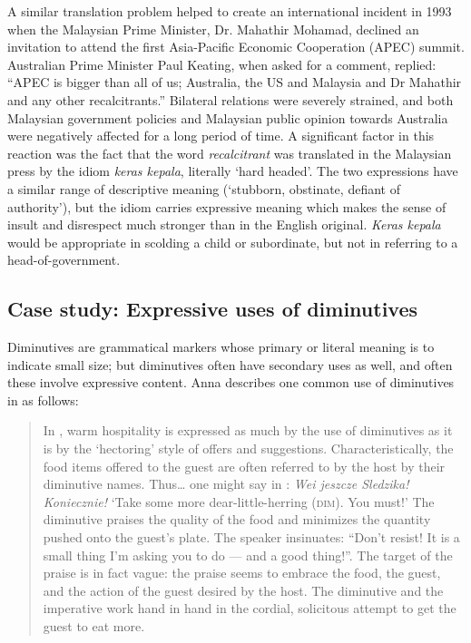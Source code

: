 A similar translation problem helped to create an international incident in 1993 when the Malaysian Prime Minister, Dr. Mahathir Mohamad, declined an invitation to attend the first Asia-Pacific Economic Cooperation (APEC) summit. {Australian} Prime Minister Paul Keating, when asked for a comment, replied: “APEC is bigger than all of us; Australia, the US and Malaysia and Dr Mahathir and any other recalcitrants.” Bilateral relations were severely strained, and both Malaysian government policies and Malaysian public opinion towards Australia were negatively affected for a long period of time. A significant factor in this reaction was the fact that the word \textit{recalcitrant} was translated in the Malaysian press by the  idiom \textit{keras kepala}, literally ‘hard headed’. The two expressions have a similar range of descriptive meaning (‘stubborn, obstinate, defiant of authority’), but the  idiom carries expressive meaning which makes the sense of insult and disrespect much stronger than in the English original. \textit{Keras kepala} would be appropriate in scolding a child or subordinate, but not in referring to a head-of-government.


\subsection{Case study: Expressive uses of diminutives}\label{sec:2.6.6}

Diminutives are grammatical markers whose primary or literal meaning is to indicate small size; but diminutives often have secondary uses as well, and often these involve expressive content. Anna \citet{Wierzbicka1985} describes one common use of diminutives in  as follows:\largerpage


\begin{quote}
In , warm hospitality is expressed as much by the use of diminutives as it is by the ‘hectoring’ style of offers and suggestions. Characteristically, the food items offered to the guest are often referred to by the host by their diminutive names. Thus… one might say in : \textit{Wei jeszcze Sledzika! Koniecznie!} ‘Take some more dear-little-herring (\textsc{dim}). You must!’ The diminutive praises the quality of the food and minimizes the quantity pushed onto the guest’s plate. The speaker insinuates: “Don’t resist! It is a small thing I’m asking you to do — and a good thing!”. The target of the praise is in fact vague: the praise seems to embrace the food, the guest, and the action of the guest desired by the host. The diminutive and the imperative work hand in hand in the cordial, solicitous attempt to get the guest to eat more.
\end{quote}


